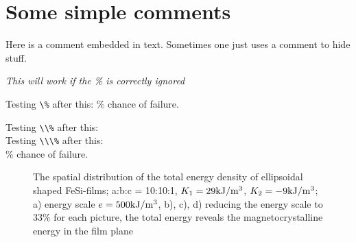﻿\documentclass{article}
\begin{document}
\section{Some simple comments}
Here %
is a comment embedded in text.
Sometimes one just uses
a comment to hide stuff.

{\it This will work %
if the \% is correctly ignored}

Testing \verb#\%# after this: \% chance of failure.

Testing \verb#\\%# after this: \\%

Testing \verb#\\\%# after this: \\\% chance of failure.

\begin{figure}[ht]
\caption{\label{zoom}The spatial distribution of the total energy density of
ellipsoidal shaped FeSi-films; a:b:c = 10:10:1, $K_1 = 29\rm kJ/m^3$, $K_2 = -9 \rm kJ/m^3$;
a) energy scale $e = 500\rm kJ/m^3$,
b), c), d) reducing the energy scale to 33\% for each picture,
the total energy reveals the magnetocrystalline energy in the film
plane}
\end{figure}
\end{document}
